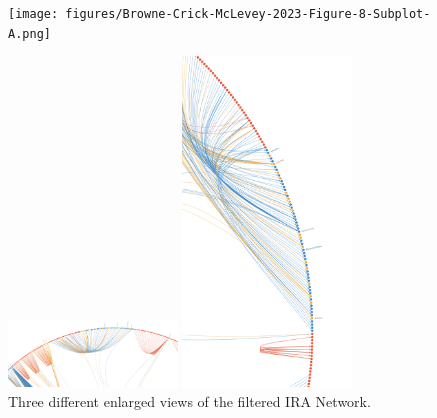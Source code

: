 \documentclass[
  12pt,
  a4paper,
  DIV=11,
  numbers=noendperiod,
  twoside,
  open=any]{scrartcl}
\begin{document}
\begin{figure}

\begin{minipage}{\linewidth}

\captionsetup{labelsep=none}\texttt{[image: figures/Browne-Crick-McLevey-2023-Figure-8-Subplot-A.png]}

\subcaption{\label{fig-ira1}}

\end{minipage}%
\newline
\begin{minipage}{\linewidth}

\captionsetup{labelsep=none}\includegraphics[width=0.4\textwidth,height=\textheight]{figures/Browne-Crick-McLevey-2023-Figure-8-Subplot-B.png}

\subcaption{\label{fig-ira2}}

\end{minipage}%
\newline
\begin{minipage}{\linewidth}

\captionsetup{labelsep=none}\includegraphics[width=0.4\textwidth,height=\textheight]{figures/Browne-Crick-McLevey-2023-Figure-8-Subplot-C.png}

\subcaption{\label{fig-ira3}}

\end{minipage}%

\caption{\label{fig-8}Three different enlarged views of the filtered IRA
Network.}

\end{figure}%
\end{document}
